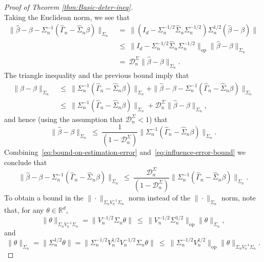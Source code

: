 \documentclass[11pt]{article}
\begin{document}
\begin{appendices}
\begin{proof}[Proof of Theorem \ref{thm:Basic-deter-ineq}]
\[\]
Taking the Euclidean norm, we see that
\begin{equation}\label{eq:influence-error-bound}
\begin{split}
\|\widehat{\beta} - \beta - \Sigma_n^{-1}(\widehat{\Gamma}_n - \widehat{\Sigma}_n\beta)\|_{\Sigma_n} ~&=~ \|(I_d - \Sigma_n ^{-1/2}\widehat{\Sigma}_n \Sigma_n ^{-1/2})\Sigma_n ^{1/2}(\widehat{\beta}  - \beta )\|\\
~&\le~ \|I_d - \Sigma_n ^{-1/2}\widehat{\Sigma}_n \Sigma_n ^{-1/2}\|_{\mathrm{op}}\|\widehat{\beta}  - \beta\|_{\Sigma_n}\\
~&=~ \mathcal{D}_n^{\Sigma}\|\widehat{\beta} - \beta\|_{\Sigma_n}.
\end{split}
\end{equation}
The triangle inequality and the previous bound imply that
\begin{align*}
\|\widehat{\beta} - \beta\|_{\Sigma_n} ~&\le~ \|\Sigma_n^{-1}(\widehat{\Gamma}_n - \widehat{\Sigma}_n\beta)\|_{\Sigma_n} + \|\widehat{\beta} - \beta - \Sigma_n^{-1}(\widehat{\Gamma}_n - \widehat{\Sigma}_n\beta)\|_{\Sigma_n}\\
~&\le~ \|\Sigma_n^{-1}(\widehat{\Gamma}_n - \widehat{\Sigma}_n\beta)\|_{\Sigma_n} + \mathcal{D}_n^{\Sigma}\|\widehat{\beta} - \beta\|_{\Sigma_n},
\end{align*}
and hence (using the assumption that $\mathcal{D}_n^{\Sigma} < 1$) that
\begin{equation}\label{eq:bound-on-estimation-error}
\|\widehat{\beta} - \beta\|_{\Sigma_n} ~\le~ \frac{1}{(1 - \mathcal{D}_n^{\Sigma})}\|\Sigma_n^{-1}(\widehat{\Gamma}_n - \widehat{\Sigma}_n\beta)\|_{\Sigma_n}.
\end{equation}
Combining~\eqref{eq:bound-on-estimation-error} and~\eqref{eq:influence-error-bound} we conclude that
\begin{equation}\label{eq:almost-final-inequality}
\|\widehat{\beta} - \beta - \Sigma_n^{-1}(\widehat{\Gamma}_n - \widehat{\Sigma}_n\beta)\|_{\Sigma_n} ~\le~ \frac{\mathcal{D}_n^{\Sigma}}{(1 - \mathcal{D}_n^{\Sigma})}\|\Sigma_n^{-1}(\widehat{\Gamma}_n - \widehat{\Sigma}_n\beta)\|_{\Sigma_n}.
\end{equation}
To obtain a bound in the $\| \cdot \|_{\Sigma_n V_n^{-1}\Sigma_n}$ norm instead of the $\| \cdot \|_{\Sigma_n}$ norm, note that, for any $\theta\in\mathbb{R}^d$,
\[
\|\theta\|_{\Sigma_nV_n^{-1}\Sigma_n} = \|V_n^{-1/2}\Sigma_n\theta\| ~\le~ \|V_n^{-1/2}\Sigma_n^{1/2}\|_{\mathrm{op}}\|\theta\|_{\Sigma_n}, 
\]
and
\[
\|\theta\|_{\Sigma_n} = \|\Sigma_n^{1/2}\theta\| = \|\Sigma_n^{-1/2}V_n^{1/2}V_n^{-1/2}\Sigma_n\theta\| ~\le~ \|\Sigma_n^{-1/2}V_n^{1/2}\|_{\mathrm{op}}\|\theta\|_{\Sigma_n V_n^{-1}\Sigma_n}.
\]
\end{proof}
\end{appendices}
\end{document}
